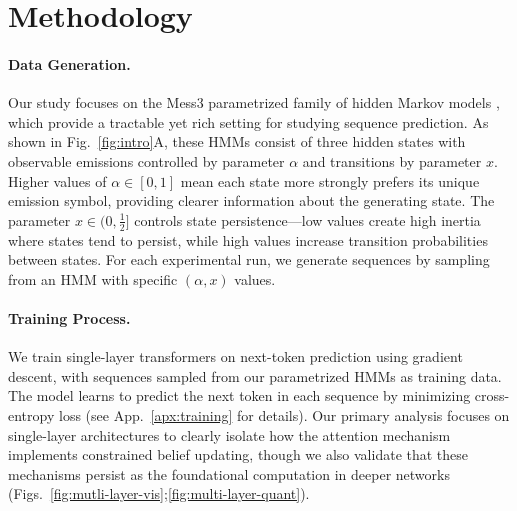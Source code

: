 \documentclass{article}
\theoremstyle{plain}
\theoremstyle{definition}
\theoremstyle{remark}
\begin{document}
\section{Methodology}
\paragraph{Data Generation.} Our study focuses on the Mess3 parametrized family of hidden Markov models 
\citep{Marzen_2017}, which provide a tractable yet rich setting for studying sequence prediction. As shown in Fig.~\ref{fig:intro}A, these HMMs consist of three hidden states with observable emissions controlled by parameter $\alpha$ and transitions by parameter $x$. Higher values of $\alpha \in [0, 1]$ mean each state more strongly prefers its unique emission symbol, providing clearer information about the generating state. The parameter $x \in (0, \tfrac{1}{2}]$ %
controls state persistence—low values create high inertia where states tend to persist, while high values increase transition probabilities between states. For each experimental run, we generate sequences by sampling from an HMM with specific $(\alpha, x)$ values.
\paragraph{Training Process.} We train single-layer transformers on next-token prediction using gradient descent, with sequences sampled from our parametrized HMMs as training data. The model learns to predict the next token in each sequence by minimizing cross-entropy loss (see App.~\ref{apx:training} for details). Our primary analysis focuses on single-layer architectures to clearly isolate how the attention mechanism implements constrained belief updating, though we also validate that these mechanisms persist as the foundational computation in deeper networks (Figs.~\ref{fig:mutli-layer-vis};\ref{fig:multi-layer-quant}). 
\end{document}
